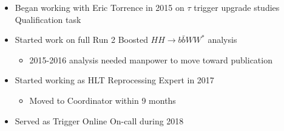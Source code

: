 \documentclass{beamer}
\begin{document}
\begin{frame}
\begin{columns}
\begin{column}{0.2\textwidth}
\begin{center}
\end{center}
\end{column}
\end{columns}
\begin{itemize}
\small
\item Began working with Eric Torrence in 2015 on $\tau$ trigger upgrade studies Qualification task
\item Started work on full Run 2 Boosted $HH\rightarrow{}b\bar{b}WW^{*}$ analysis
\begin{itemize}
\footnotesize
\item 2015-2016 analysis needed manpower to move toward publication
\end{itemize}
\item Started working as HLT Reprocessing Expert in 2017
\begin{itemize}
\item Moved to Coordinator within 9 months
\end{itemize}
\item Served as Trigger Online On-call during 2018
\end{itemize}
\end{frame}
\end{document}
